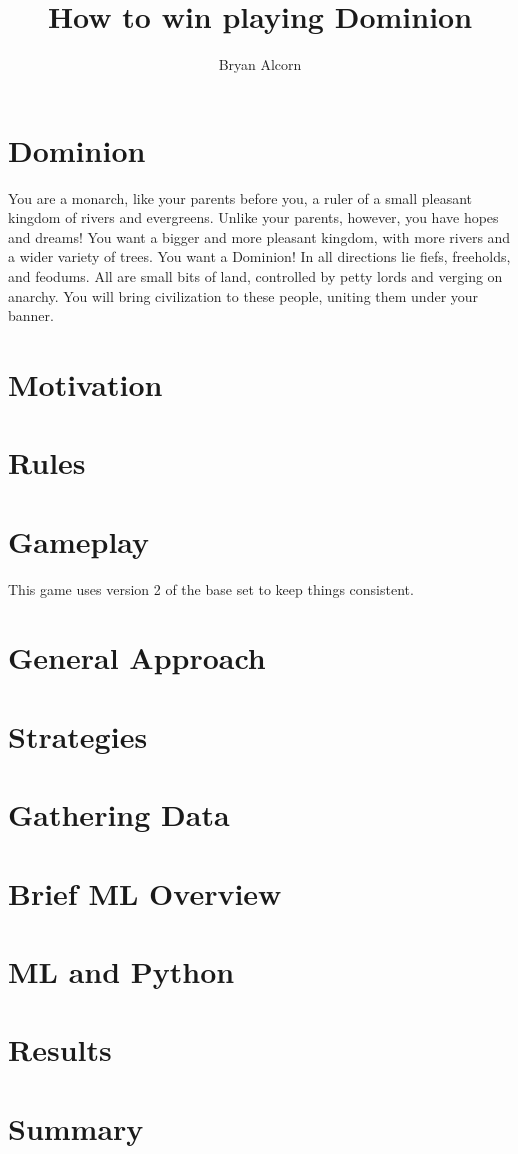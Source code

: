 \documentclass[11pt, oneside]{article}   	%
\title{How to win playing Dominion}
\author{Bryan Alcorn}
\date{}							%
\begin{document}
\maketitle

\section{Dominion}

You are a monarch, like your parents before you, a ruler of a small pleasant kingdom of rivers and evergreens.
Unlike your parents, however, you have hopes and dreams!
You want a bigger and more pleasant kingdom, with more rivers and a wider variety of trees.
You want a Dominion! In all directions lie fiefs, freeholds, and feodums.
All are small bits of land, controlled by petty lords and verging on anarchy.
You will bring civilization to these people, uniting them under your banner.

\section{Motivation}

\section{Rules}

\section{Gameplay}

This game uses version 2 of the base set to keep things consistent.

\section{General Approach}

\section{Strategies}

\section{Gathering Data}

\section{Brief ML Overview}

\section{ML and Python}

\section{Results}

\section{Summary}

\end{document}
